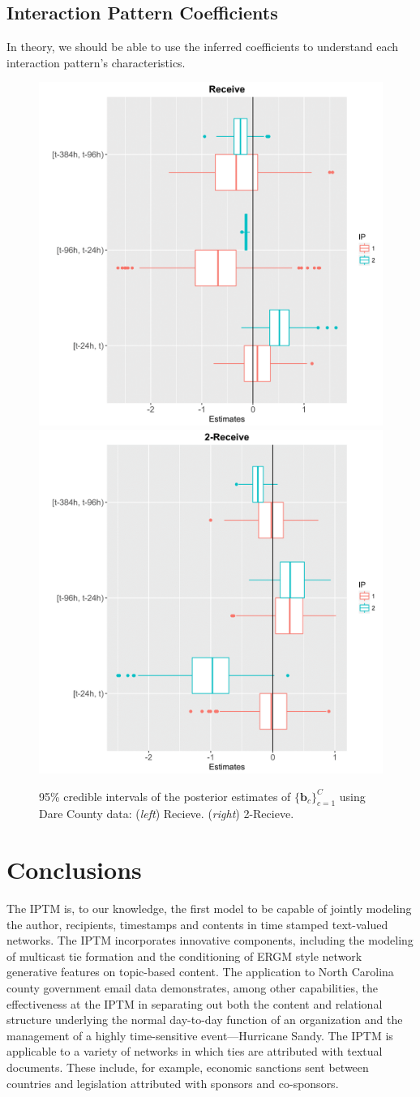 \documentclass[twoside]{article}
\begin{document}
\subsection{Interaction Pattern Coefficients}\label{subsec:Interaction Pattern Coefficients}
In theory, we should be able to use the inferred coefficients to
understand each interaction pattern's characteristics.
\begin{figure}[h]
	\centering
\includegraphics[width=.235\textwidth]{plots/receive-1.png} \includegraphics[width=.235\textwidth]{plots/2receive-1.png}
	\caption{95\% credible intervals of the posterior estimates of $\{\boldsymbol{b}_c\}_{c=1}^C$ using Dare County data: (\textit{left}) Recieve. (\textit{right}) 2-Recieve. }
	\label{fig:b}
\end{figure}
\section{Conclusions}\label{sec:Conclusions}
The IPTM is, to our knowledge, the first model to be capable of jointly modeling the author, recipients, timestamps and contents in time stamped text-valued networks. The IPTM incorporates innovative components, including the modeling of multicast tie formation and the conditioning of ERGM style network generative features on topic-based content. The application to North Carolina county government email data demonstrates, among other capabilities, the effectiveness at the IPTM in separating out both the content and relational structure underlying the normal day-to-day function of an organization and the management of a highly time-sensitive event---Hurricane Sandy. The IPTM is applicable to a variety of networks in which ties are attributed with textual documents. These include, for example, economic sanctions sent between countries and legislation attributed with sponsors and co-sponsors. 
\end{document}
